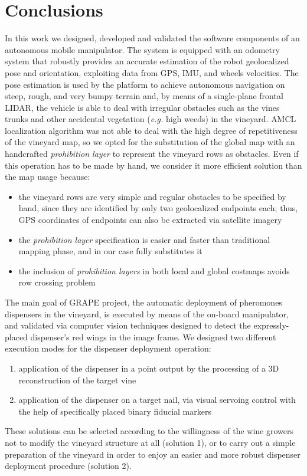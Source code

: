 
\chapter{Conclusions} \label{chap:conclusions}

In this work we designed, developed and validated the software components of an autonomous mobile manipulator. The system is equipped with an odometry system that robustly provides an accurate estimation of the robot geolocalized pose and orientation, exploiting data from GPS, IMU, and wheels velocities. The pose estimation is used by the platform to achieve autonomous navigation on steep, rough, and very bumpy terrain and, by means of a single-plane frontal \ac{LIDAR}, the vehicle is able to deal with irregular obstacles such as the vines trunks and other accidental vegetation (\textit{e.g.} high weeds) in the vineyard.
\ac{AMCL} localization algorithm was not able to deal with the high degree of repetitiveness of the vineyard map, so we opted for the substitution of the global map with an handcrafted  \textit{prohibition layer} to represent the vineyard rows as obstacles. Even if this operation has to be made by hand, we consider it more efficient solution than the map usage because:
\begin{itemize}
	\item the vineyard rows are very simple and regular obstacles to be specified by hand, since they are identified by only two geolocalized endpoints each; thus, GPS coordinates of endpoints can also be extracted via satellite imagery
	\item the \textit{prohibition layer} specification is easier and faster than traditional mapping phase, and in our case fully substitutes it
	\item the inclusion of \textit{prohibition layers} in both local and global costmaps avoids row crossing problem
\end{itemize}
The main goal of \ac{GRAPE} project, the automatic deployment of pheromones dispensers in the vineyard, is executed by means of the on-board manipulator, and validated via computer vision techniques designed to detect the expressly-placed dispenser's red wings in the image frame.
We designed two different execution modes for the dispenser deployment operation:
\begin{enumerate}
	\item application of the dispenser in a point output by the processing of a 3D reconstruction of the target vine
	\item application of the dispenser on a target nail, via visual servoing control with the help of specifically placed binary fiducial markers 
\end{enumerate}
These solutions can be selected according to the willingness of the wine growers not to modify the vineyard structure at all (solution 1), or to carry out a simple preparation of the vineyard in order to enjoy an easier and more robust dispenser deployment procedure (solution 2).

